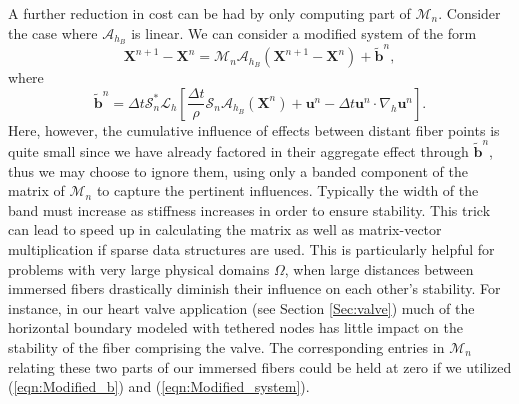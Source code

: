 \documentclass[preprint,12pt]{elsarticle}
\begin{document}
A further reduction in cost can be had by only computing part of $\mathcal{M}_n$. Consider the case where $\mathcal{A}_{h_B}$ is linear. We can consider a modified system of the form
\begin{equation}
\mathbf{X}^{n+1}-\mathbf{X}^n = \mathcal{M}_n \mathcal{A}_{h_B} (\mathbf{X}^{n+1}-\mathbf{X}^n) + \mathbf{\tilde{b}}^n,
\label{eqn:Modified_system}
\end{equation}
where 
\begin{equation}
\mathbf{\tilde{b}}^n=\Delta t\mathcal{S}^*_n\mathcal{L}_h
\left[\frac{\Delta t}{\rho} \mathcal{S}_n\mathcal{A}_{h_B}(\mathbf{X}^n) + \mathbf{u}^n - \Delta t\mathbf{u}^n \cdot \nabla_h \mathbf{u}^n \right].
\label{eqn:Modified_b}
\end{equation}
Here, however, the cumulative influence of effects between distant fiber points is quite small since we have already factored in their aggregate effect through $\mathbf{\tilde{b}}^n$, thus we may choose to ignore them, using only a banded component of the matrix of $\mathcal{M}_n$ to capture the pertinent influences. Typically the width of the band must increase as stiffness increases in order to ensure stability. This trick can lead to speed up in calculating the matrix as well as matrix-vector multiplication if sparse data structures are used. This is particularly helpful for problems with very large physical domains $\Omega$, when large distances between immersed fibers drastically diminish their influence on each other's stability. For instance, in our heart valve application (see Section \ref{Sec:valve}) much of the horizontal boundary modeled with tethered nodes has little impact on the stability of the fiber comprising the valve. The corresponding entries in $\mathcal{M}_n$ relating these two parts of our immersed fibers could be held at zero if we utilized (\ref{eqn:Modified_b}) and (\ref{eqn:Modified_system}).
\end{document}
